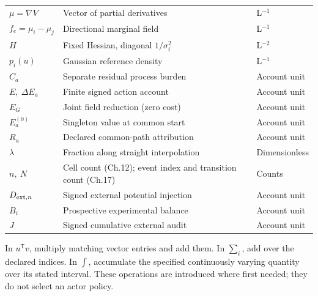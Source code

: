 \begin{longtable}{@{}p{65pt}p{194pt}p{80pt}@{}}
$\mu=\nabla V$ & Vector of partial derivatives & L$^{-1}$\\
$f_e=\mu_i-\mu_j$ & Directional marginal field & L$^{-1}$\\
$H$ & Fixed Hessian, diagonal $1/\sigma_i^2$ & L$^{-2}$\\
$p_i(u)$ & Gaussian reference density & L$^{-1}$\\
$C_a$ & Separate residual process burden & Account unit\\
$E,\ \Delta E_a$ & Finite signed action account & Account unit\\
$E_G$ & Joint field reduction (zero cost) & Account unit\\
$E_a^{(0)}$ & Singleton value at common start & Account unit\\
$R_a$ & Declared common-path attribution & Account unit\\
$\lambda$ & Fraction along straight interpolation & Dimensionless\\
$n,\ N$ & Cell count (Ch.12); event index and transition count (Ch.17) & Counts\\
$D_{{\rm ext},n}$ & Signed external potential injection & Account unit\\
$B_i$ & Prospective experimental balance & Account unit\\
$J$ & Signed cumulative external audit & Account unit\\
\end{longtable}
\renewcommand{\arraystretch}{1}

In $u^{\mathsf T}v$, multiply matching vector entries and add them. In $\sum_i$, add over the declared indices. In $\int$, accumulate the specified continuously varying quantity over its stated interval. These operations are introduced where first needed; they do not select an actor policy.
